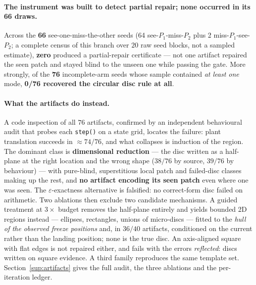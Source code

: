 \documentclass[11pt]{article}
\theoremstyle{definition}
\theoremstyle{remark}
\begin{document}
\paragraph{The instrument was built to detect partial repair; none occurred in its 66 draws.} Across the \textbf{66} see-one-miss-the-other seeds (64 see-$P_1$-miss-$P_2$ plus 2 miss-$P_1$-see-$P_2$; a complete census of this branch over $20$ raw seed blocks, not a sampled estimate), \textbf{zero} produced a partial-repair certificate --- not one artifact repaired the seen patch and stayed blind to the unseen one while passing the gate. More strongly, of the \textbf{76} incomplete-arm seeds whose sample contained \emph{at least one} mode, \textbf{0/76 recovered the circular disc rule at all}.

\paragraph{What the artifacts do instead.} A code inspection of all $76$ artifacts, confirmed by an independent behavioural audit that probes each \texttt{step()} on a state grid, locates the failure: plant translation succeeds in ${\approx}74/76$, and what collapses is induction of the region. The dominant class is \textbf{dimensional reduction} --- the disc written as a half-plane at the right location and the wrong shape ($38/76$ by source, $39/76$ by behaviour) --- with pure-blind, superstitious local patch and failed-disc classes making up the rest, and \textbf{no artifact encoding its seen patch} even where one was seen. The $\varepsilon$-exactness alternative is falsified: no correct-form disc failed on arithmetic. Two ablations then exclude two candidate mechanisms. A guided treatment at $3\times$ budget removes the half-plane entirely and yields bounded 2D regions instead --- ellipses, rectangles, unions of micro-discs --- fitted to the \emph{hull of the observed freeze positions} and, in $36/40$ artifacts, conditioned on the current rather than the landing position; none is the true disc. An axis-aligned square with flat edges is not repaired either, and fails with the errors \emph{reflected}: discs written on square evidence. A third family reproduces the same template set. Section~\ref{sup:artifacts} gives the full audit, the three ablations and the per-iteration ledger.
\end{document}
